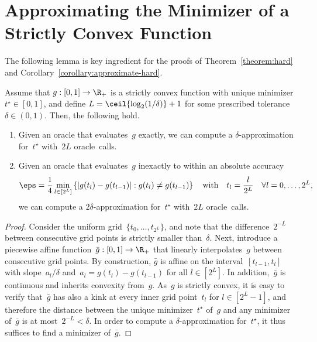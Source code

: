 \documentclass[11pt, a4paper, oneside, reqno]{article}
\begin{document}
	\appendix
	\renewcommand\thesection{\Alph{section}}
		{\color{black}
			\section{Approximating the Minimizer of a Strictly Convex Function}
			The following lemma is  key ingredient for the proofs of Theorem~\ref{theorem:hard} and Corollary~\ref{corollary:approximate-hard}.
	\begin{lemma}
	\label{lemma:strictly_convex_min}
	    Assume that $g:[0,1] \to \R_{+}$ is a strictly convex function with unique minimizer~$t^\star\in[0,1]$, and define $L = \ceil{\log_2(1/\delta)} +1$ for some prescribed tolerance~$\delta \in (0,1)$. Then, the following hold.
	    \begin{enumerate}[label=(\roman*)]
	        \item Given an oracle that evaluates~$g$ exactly, we can compute a $\delta$-approximation for~$t^\star$ with~$2L$ oracle~calls.
	        \item Given an oracle that evaluates~$g$ inexactly to within an absolute accuracy
	        \begin{equation*}
	             \eps = \frac{1}{4}\min_{l\in [2^L] } \left\{|g(t_l) - g(t_{l-1})| : g(t_l) \neq g(t_{l-1}) \right\} \quad \text{with} \quad  t_l = \frac{l}{2^{L}} \quad \forall l =0,\ldots,2^L,
	        \end{equation*}
	        we can compute a $2\delta$-approximation for~$t^\star$ with~$2L$ oracle~calls.
	    \end{enumerate}
	\end{lemma}
	\begin{proof}
Consider the uniform grid~$\{t_0, \ldots, t_{2^L}\}$, and note that the difference~$2^{-L}$ between consecutive grid points is strictly smaller than~$\delta$. Next, introduce a piecewise affine function~$\bar g : [0,1] \to \R_+$ that linearly interpolates~$g$ between consecutive grid points. By construction, $\bar g$ is affine on the interval~$[t_{l-1}, t_{l}]$ with slope~$a_l/\delta$ and~$a_l= g(t_{l}) - g(t_{l-1})$ for all $l \in [2^{L}]$. In addition,~$\bar g$ is continuous and inherits convexity from~$g$. As~$g$ is strictly convex, it is easy to verify that~$\bar g$ has also a kink at every inner grid point~$t_l$ for $l\in[2^L-1]$, and therefore the distance between the unique minimizer~$t^\star$ of~$g$ and any minimizer of~$\bar g$ is at most~$2^{-L}<\delta$. In order to compute a $\delta$-approximation for~$t^\star$, it thus suffices to find a minimizer of~$\bar g$.



\end{proof}}
\end{document}
